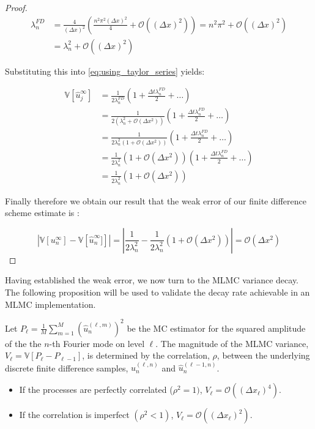 \begin{proof}
\begin{align*}
    \lambda_n^{FD} &= \frac{4}{(\Delta x)^2}\left(\frac{n^2 
    \pi^2 (\Delta x)^2}{4} + \mathcal{O}((\Delta x)^2)\right) = 
    n^2\pi^2 + \mathcal{O}((\Delta x)^2) \\
    &= \lambda_n^2 + \mathcal{O}((\Delta x)^2)
\end{align*}

Substituting this into \eqref{eq:using_taylor_series} yields:

\begin{align*}
    \mathbb{V}[\hat{u}_j^\infty] &= 
    \frac{1}{2\lambda_n^{FD}}\left(1 + 
    \frac{\Delta t \lambda_n^{FD}}{2} + \dots\right) \\
    &= \frac{1}{2\left(\lambda_n^2 + \mathcal{O}(\Delta x^2)\right)}\left(1 + \frac{\Delta t \lambda_n^{FD}}{2} + \dots\right) \\
    &= \frac{1}{2 \lambda_n^2 \left(1 + \mathcal{O}(\Delta x^2)\right)}\left(1 + \frac{\Delta t \lambda_n^{FD}}{2} + \dots\right) \\
    &= \frac{1}{2 \lambda_n^2}\left(1 + \mathcal{O}(\Delta x^2)\right)\left(1 + \frac{\Delta t \lambda_n^{FD}}{2} + \dots\right) \\
    &= \frac{1}{2 \lambda_n^2}\left(1 + \mathcal{O}(\Delta x^2)\right)
    \label{eq:final_result}
\end{align*}

Finally therefore we obtain our result that the weak error
of our finite difference scheme estimate is :

\begin{equation*}
    |\mathbb{V}\left[u_n^\infty\right] - \mathbb{V}\left[\hat{u}_n^\infty]\right]| = |\frac{1}{2\lambda_n^2} - \frac{1}{2 \lambda_n^2}\left(1 + \mathcal{O}(\Delta x^2)\right)|
    = \mathcal{O}(\Delta x^2)
\end{equation*}
\end{proof}


Having established the weak error, we now turn to the MLMC variance decay. 
The following proposition will be used to validate the decay 
rate achievable in an MLMC implementation.

\begin{proposition}
    \label{prop:variance_decay_fourier}
    Let $P_\ell = \frac{1}{M}\sum_{m=1}^M(\hat{u}_n^{(\ell,m)})^2$ 
    be the MC estimator for the squared amplitude 
    of the the $n$-th Fourier mode on level $\ell$. The magnitude of 
    the MLMC 
    variance, $V_\ell = \mathbb{V}[P_\ell - P_{\ell - 1}]$, is 
    determined by the correlation, $\rho$, between the underlying 
    discrete finite difference samples, 
    $\hat{u}_n^{(\ell, n)}$ and $\hat{u}_n^{(\ell-1, n)}$.
    \begin{itemize}
        \item If the processes are perfectly correlated ($\rho^2 = 1)$,
         $V_\ell = \mathcal{O}((\Delta x_\ell)^4)$.
        \item If the correlation is imperfect $(\rho^2 < 1)$, 
        $V_\ell = \mathcal{O}((\Delta x_\ell)^2)$.
    \end{itemize}
\end{proposition}

